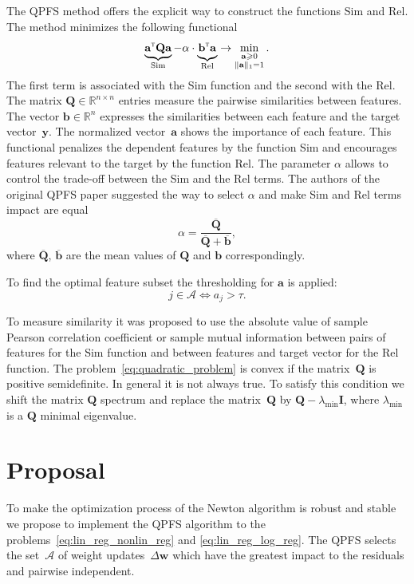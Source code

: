 \documentclass[a4paper,12pt]{article}
\renewcommand{\geq}{\ensuremath{\geqslant}}
\theoremstyle{plain} %
\theoremstyle{definition} %
\theoremstyle{remark} %
\newcommand{\ba}{\mathbf{a}}
\newcommand{\bb}{\mathbf{b}}
\newcommand{\bw}{\mathbf{w}}
\newcommand{\by}{\mathbf{y}}
\newcommand{\cA}{\mathcal{A}}
\newcommand{\bQ}{\mathbf{Q}}
\newcommand{\bbR}{\mathbb{R}}
\newcommand{\T}{{\text{\tiny\sffamily\upshape\mdseries T}}}
\begin{document}
	The QPFS method offers the explicit way to construct the functions Sim and Rel. 
	The method minimizes the following functional
	\begin{equation}
		\underbrace{\ba^{\T} \bQ \ba}_{\text{Sim}} - \alpha \cdot \underbrace{\vphantom{()} \mathbf{b}^{\T} \ba}_{\text{Rel}} \rightarrow \min_{\substack{\ba \geq 0 \\ \|\ba\|_1=1}}.
		\label{eq:quadratic_problem}
	\end{equation}
	The first term is associated with the Sim function and the second with the Rel. 
  	The matrix $\bQ \in \bbR^{n \times n}$ entries measure the pairwise similarities between features. 
  	The vector $\mathbf{b} \in \bbR^n$ expresses the similarities between each feature and the target vector~$\by$.
  	The normalized vector~$\ba$ shows the importance of each feature. 
  	This functional penalizes the dependent features by the function Sim and encourages features relevant to the target by the function Rel. 
  	The parameter $\alpha$ allows to control the trade-off between the Sim and the Rel terms.
  	The authors of the original QPFS paper suggested the way to select $\alpha$ and make Sim and Rel terms impact are equal
  	\[
  		\alpha = \frac{\overline{\bQ}}{\overline{\bQ} + \overline{\bb}},
  	\] 
  	where $\overline{\bQ}$, $\overline{\bb}$ are the mean values of $\bQ$ and $\bb$ correspondingly.
  	
  	To find the optimal feature subset the thresholding for $\ba$ is applied:
  	\[
  		j \in \mathcal{A} \Leftrightarrow a_j > \tau.
  	\]
  	
  	To measure similarity it was proposed to use the absolute value of sample Pearson correlation coefficient or sample mutual information between pairs of features for the Sim function and between features and target vector for the Rel function.
  	The problem~\ref{eq:quadratic_problem} is convex if the matrix~$\bQ$ is positive semidefinite. In general it is not always true. 
  	To satisfy this condition we shift the matrix $\bQ$ spectrum and replace the matrix~$\bQ$ by $\bQ - \lambda_{\text{min}} \mathbf{I}$, where $\lambda_{\text{min}} $ is a $\bQ$ minimal eigenvalue.
  	
  	\section*{Proposal}
  	To make the optimization process of the Newton algorithm is robust and stable we propose to implement the QPFS algorithm to the problems~\eqref{eq:lin_reg_nonlin_reg} and \eqref{eq:lin_reg_log_reg}. 
  	The QPFS selects the set~$\cA$ of weight updates~$\Delta \bw$ which have the greatest impact to the residuals and pairwise independent. 
  	
\end{document}
